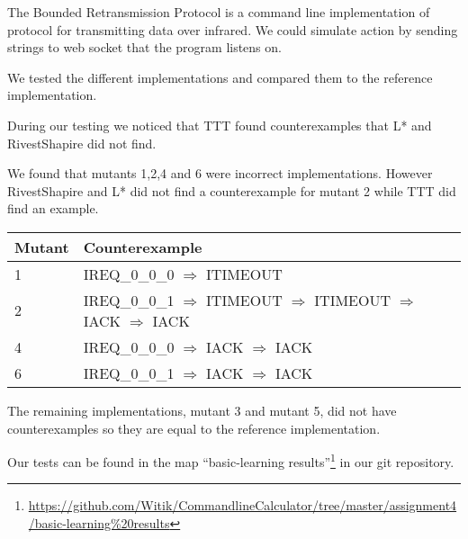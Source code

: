 \documentclass[11pt,a4paper]{article}
\begin{document}
The Bounded Retransmission Protocol is a command line implementation
of protocol for transmitting data over infrared. We could simulate
action by sending strings to web socket that the program listens on.

We tested the different implementations and compared them to the
reference implementation.

During our testing we noticed that TTT found counterexamples that L* and
RivestShapire did not find.

We found that mutants 1,2,4 and 6 were incorrect implementations.
However RivestShapire and L* did not find a counterexample for mutant 2
while TTT did find an example.

\begin{center}
\begin{tabular}{l|l}
\textbf{Mutant} & \textbf{Counterexample}\\
\hline
1 & IREQ\_0\_0\_0 $\Rightarrow$ ITIMEOUT\\
2 & IREQ\_0\_0\_1 $\Rightarrow$ ITIMEOUT $\Rightarrow$ ITIMEOUT $\Rightarrow$ IACK $\Rightarrow$ IACK\\
4 & IREQ\_0\_0\_0 $\Rightarrow$ IACK $\Rightarrow$ IACK\\
6 & IREQ\_0\_0\_1 $\Rightarrow$ IACK $\Rightarrow$ IACK\\
\end{tabular}
\end{center}

The remaining implementations, mutant 3 and mutant 5, did not have
counterexamples so they are equal to the reference implementation.

Our tests can be found in the map ``basic-learning
results''\footnote{\url{https://github.com/Witik/CommandlineCalculator/tree/master/assignment4/basic-learning\%20results}}
in our git repository.



\end{document}
